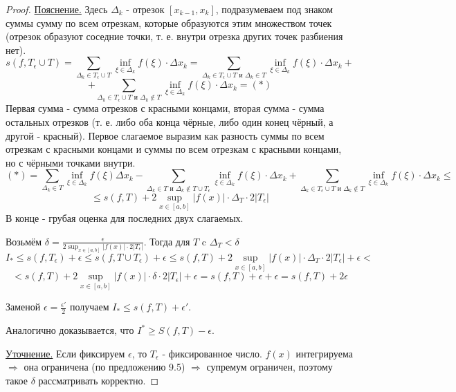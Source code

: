 \begin{proof}
    	\underline{Пояснение.} Здесь $\Delta_k$ - отрезок $[x_{k - 1}, x_k]$, подразумеваем под знаком суммы сумму по всем отрезкам, которые образуются этим множеством точек (отрезок образуют соседние точки, т. е. внутри отрезка других точек разбиения нет).
    	\[ s(f, T_{\epsilon} \cup T) = \sum_{\Delta_k \in T_{\epsilon} \cup T} \inf_{\xi \in \Delta_k} {f(\xi) \cdot \Delta x_k} = \sum_{\Delta_k \in T_{\epsilon} \cup T \text{ и } \Delta_k \in T} \inf_{\xi \in \Delta_k} {f(\xi) \cdot \Delta x_k} + \]
    	\[ + \sum_{\Delta_k \in T_{\epsilon} \cup T \text{ и } \Delta_k \not\in T} \inf_{\xi \in \Delta_k} {f(\xi) \cdot \Delta x_k} = (*) \]
    	Первая сумма - сумма отрезков с красными концами, вторая сумма - сумма остальных отрезков (т. е. либо оба конца чёрные, либо один конец чёрный, а другой - красный).
    	Первое слагаемое выразим как разность суммы по всем отрезкам с красными концами и суммы по всем отрезкам с красными концами, но с чёрными точками внутри.
    	\[ (*) = \sum_{\Delta_k \in T} \inf_{\xi \in \Delta_k} {f(\xi) \Delta x_k} - \sum_{\Delta_k \in T \text{ и } \Delta_k \not\in T \cup T_{\epsilon}} {\inf_{\xi \in \Delta_k} {f(\xi) \cdot \Delta x_k}} + \sum_{\Delta_k \in T_{\epsilon} \cup T \text{ и } \Delta_k \not\in T} {\inf_{\xi \in \Delta_k} {f(\xi) \cdot \Delta x_k}} \leqslant \]
    	\[ \leqslant s(f, T) + 2\sup_{x \in [a, b]} {|f(x)| \cdot \Delta_T \cdot 2|T_{\epsilon}|} \]
    	В конце - грубая оценка для последних двух слагаемых.
    	
    	Возьмём $\displaystyle \delta = \frac{\epsilon}{\displaystyle2\sup_{x \in [a, b]} {|f(x)| \cdot 2|T_{\epsilon}|}}$. Тогда для $T$ c $\Delta_T < \delta$
    	\[ I_{*} \leqslant s(f, T_{\epsilon}) + \epsilon \leqslant s(f, T \cup T_{\epsilon}) + \epsilon \leqslant s(f, T) + 2\sup_{x \in [a, b]} {|f(x)| \cdot \Delta_T \cdot 2|T_{\epsilon}|} + \epsilon < \]
    	\[ < s(f, T) + 2\sup_{x \in [a, b]} {|f(x)| \cdot \delta \cdot 2|T_{\epsilon}|} + \epsilon = s(f, T) + \epsilon + \epsilon = s(f, T) + 2\epsilon \]
    	
    	Заменой $\epsilon = \frac{\epsilon'}{2}$ получаем $I_{*} \leqslant s(f, T) + \epsilon'$.
    	
    	Аналогично доказывается, что $I^{*} \geqslant S(f, T) - \epsilon$.
    	
    	\underline{Уточнение.} Если фиксируем $\epsilon$, то $T_{\epsilon}$ - фиксированное число. $f(x)$ интегрируема $\Rightarrow$ она ограничена (по предложению 9.5) $\Rightarrow$ супремум ограничен, поэтому такое $\delta$ рассматривать корректно.
    \end{proof}
    
